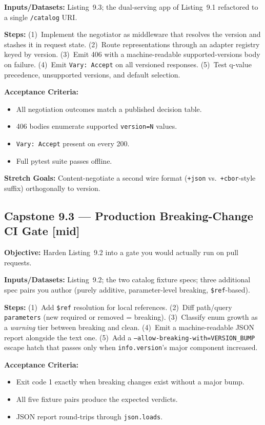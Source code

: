 \textbf{Inputs/Datasets:} Listing~9.3; the dual-serving app of Listing~9.1
refactored to a single \texttt{/catalog} URI.

\textbf{Steps:} (1)~Implement the negotiator as middleware that resolves the
version and stashes it in request state. (2)~Route representations through an
adapter registry keyed by version. (3)~Emit 406 with a machine-readable
supported-versions body on failure. (4)~Emit \texttt{Vary: Accept} on all
versioned responses. (5)~Test q-value precedence, unsupported versions, and
default selection.

\textbf{Acceptance Criteria:}
\begin{itemize}
  \item[$\square$] All negotiation outcomes match a published decision table.
  \item[$\square$] 406 bodies enumerate supported \texttt{version=N} values.
  \item[$\square$] \texttt{Vary: Accept} present on every 200.
  \item[$\square$] Full pytest suite passes offline.
\end{itemize}

\textbf{Stretch Goals:} Content-negotiate a second wire format
(\texttt{+json} vs.\ \texttt{+cbor}-style suffix) orthogonally to version.

\subsection*{Capstone 9.3 --- Production Breaking-Change CI Gate \hfill [mid]}
\textbf{Objective:} Harden Listing~9.2 into a gate you would actually run on
pull requests.

\textbf{Inputs/Datasets:} Listing~9.2; the two catalog fixture specs; three
additional spec pairs you author (purely additive, parameter-level breaking,
\texttt{\$ref}-based).

\textbf{Steps:} (1)~Add \texttt{\$ref} resolution for local references.
(2)~Diff path/query \texttt{parameters} (new required or removed =
breaking). (3)~Classify enum growth as a \emph{warning} tier between breaking
and clean. (4)~Emit a machine-readable JSON report alongside the text one.
(5)~Add a \texttt{--allow-breaking-with=VERSION\_BUMP} escape hatch that
passes only when \texttt{info.version}'s major component increased.

\textbf{Acceptance Criteria:}
\begin{itemize}
  \item[$\square$] Exit code 1 exactly when breaking changes exist without a
        major bump.
  \item[$\square$] All five fixture pairs produce the expected verdicts.
  \item[$\square$] JSON report round-trips through \texttt{json.loads}.
\end{itemize}

